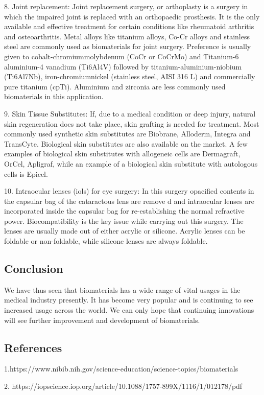 \documentclass[11pt]{article}
\begin{document}
8. Joint replacement: Joint replacement surgery, or arthoplasty is a surgery  in which the impaired joint is replaced with an orthopaedic prosthesis. It is the only available and effective treatment for certain conditions like rheumatoid arthritis and osteoarthritis. Metal alloys like titanium alloys, Co-Cr alloys and stainless steel are commonly used as biomaterials for joint surgery. Preference is usually given to cobalt-chromiummolybdenum (CoCr or CoCrMo) and Titanium-6 aluminium-4 vanadium (Ti6Al4V) followed by titanium-aluminium-niobium (Ti6Al7Nb), iron-chromiumnickel (stainless steel, AISI 316 L) and commercially pure titanium (cpTi). Aluminium and zirconia are less commonly used biomaterials in this application.

9. Skin Tissue Substitutes: If, due to a medical condition or deep injury, natural skin regeneration does not take place, skin grafting is needed for treatment. Most commonly used synthetic skin substitutes are Biobrane, Alloderm, Integra and TransCyte. Biological skin substitutes are also available on the market. A few examples of biological skin substitutes with allogeneic cells are Dermagraft, OrCel, Apligraf, while an example of a biological skin substitute with autologous cells is Epicel.

10. Intraocular lenses (iols) for eye surgery: In this surgery opacified contents in the capsular bag of the cataractous lens are remove d and intraocular lenses are incorporated inside the capsular bag for re-establishing the normal refractive power. Biocompatibility is the key issue while carrying out this surgery. The lenses are usually made out of either acrylic or silicone. Acrylic lenses can be foldable or non-foldable, while silicone lenses are always foldable. 

\subsection*{\centering Conclusion}

We have thus seen that biomaterials has a wide range of vital usages in the medical industry presently. It has become very popular and is continuing to see increased usage across the world. We can only hope that continuing innovations will see further improvement and development of biomaterials.




\subsection*{References}

1.https://www.nibib.nih.gov/science-education/science-topics/biomaterials

2. https://iopscience.iop.org/article/10.1088/1757-899X/1116/1/012178/pdf
\end{document}
